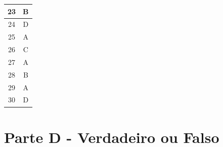 \documentclass[12pt,a4paper,titlepage]{article}
\begin{document}
\begin{table}[h]
\begin{tabular}{|c|c|}
        \hline
        23 & B \\
        \hline
        24 & D \\
        \hline
        25 & A \\
        \hline
        26 & C \\
        \hline
        27 & A \\
        \hline
        28 & B \\
        \hline
        29 & A \\
        \hline
        30 & D \\
        \hline
    \end{tabular}
    \label{gabarito_multipla_escolha}
\end{table}

\section{Parte D - Verdadeiro ou Falso}
\end{document}
